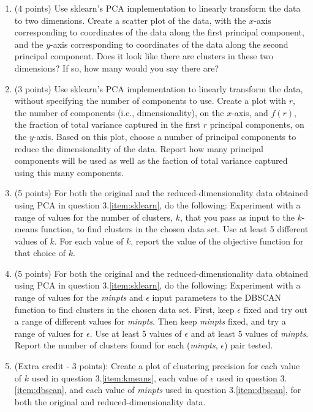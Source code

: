 \documentclass[11pt]{article}
\begin{document}
\begin{enumerate}

    \item (4 points) Use sklearn's PCA implementation to linearly transform the
    data to two dimensions. Create a scatter plot of the data, with the $x$-axis
    corresponding to coordinates of the data along the first principal
    component, and the $y$-axis corresponding to coordinates of the data along
    the second principal component. Does it look like there are clusters in
    these two dimensions? If so, how many would you say there are?

    \item (3 points) Use sklearn's PCA implementation to linearly transform the
    data, without specifying the number of components to use. Create a plot with
    $r$, the number of components (i.e., dimensionality), on the $x$-axis, and
    $f(r)$, the fraction of total variance captured in the first $r$ principal
    components, on the $y$-axis. Based on this plot, choose a number of
    principal components to reduce the dimensionality of the data. Report how
    many principal components will be used as well as the faction of total
    variance captured using this many components.
    \label{item:sklearn}

    \item (5 points) For both the original and the reduced-dimensionality data
    obtained using PCA in question 3.\ref{item:sklearn}, do the
    following: Experiment with a range of values for the number of clusters,
    $k$, that you pass as input to the $k$-means function, to find clusters in
    the chosen data set. Use at least 5 different values of $k$. For each value
    of $k$, report the value of the objective function for that choice of $k$.
    \label{item:kmeans}

    \item (5 points) For both the original and the reduced-dimensionality data
    obtained using PCA in question 3.\ref{item:sklearn}, do the following:
    Experiment with a range of values for the \emph{minpts} and $\epsilon$ input
    parameters to the DBSCAN function to find clusters in the chosen data set.
    First, keep $\epsilon$ fixed and try out a range of different values for
    \emph{minpts}. Then keep \emph{minpts} fixed, and try a range of values for
    $\epsilon$. Use at least 5 values of $\epsilon$ and at least 5 values of
    \emph{minpts}. Report the number of clusters found for each (\emph{minpts},
    $\epsilon$) pair tested.
    \label{item:dbscan}

    \item (Extra credit - 3 points): Create a plot of clustering precision for
    each value of $k$ used in question 3.\ref{item:kmeans}, each value of
    $\epsilon$ used in question 3.\ref{item:dbscan}, and each value of
    \emph{minpts} used in question 3.\ref{item:dbscan}, for both the original
    and reduced-dimensionality data.

\end{enumerate}
\end{document}
